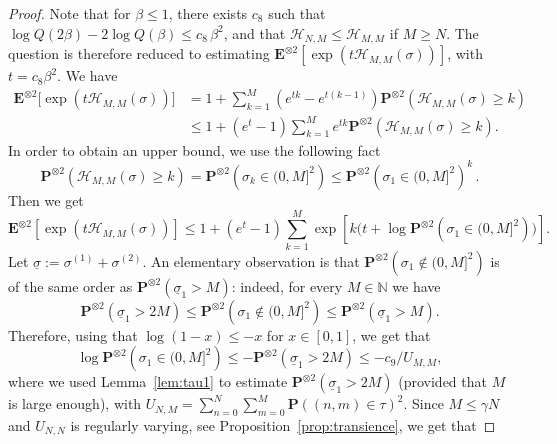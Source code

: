 \documentclass[AHL,Unicode,longabstracts]{cedram}
\newcommand{\cH}{\ensuremath{\mathcal{H}}}
\newcommand{\bP}{\ensuremath{\mathbf{P}}}
\newcommand{\bE}{\ensuremath{\mathbf{E}}}
\newcommand{\bbN}{\ensuremath{\mathbb{N}}}
\begin{document}
\begin{proof}
Note that for $\beta \le 1$, there exists $c_8$ such that $\log Q(2 \beta) - 2 \log Q(\beta) \le c_{8}\,\beta^ 2$, and that $\cH_{N,M} \leq \cH_{M,M}$ if $M\geq N$. The question is therefore reduced to estimating $\bE^{\otimes 2} \left[\exp (t \cH_{M,M}(\sigma)) \right]$, with $t=c_8 \beta^2$. We have
\begin{equation}
\begin{split}
\bE^{\otimes 2} \Big[\exp (t \cH_{M,M}(\sigma)) \Big] & = 1 + \sum_{k=1}^M \left(e^{tk} - e^{t (k-1)} \right) \bP^{\otimes 2} \left(\cH_{M,M}(\sigma) \ge k \right) \\
& \le 1+ (e^{t}-1) \sum_{k=1}^M e^{t k} \bP^{\otimes 2} \left(\cH_{M,M}(\sigma) \ge k \right).
\end{split}
\end{equation}
In order to obtain an upper bound, we use the following fact
\begin{equation}
\bP^{\otimes 2} \left(\cH_{M,M}(\sigma) \ge k \right) = \bP^{\otimes 2} \left(\sigma_k \in (0,M]^2\right) \le { \bP^{\otimes 2} \left(\sigma_1 \in (0,M]^2 \right) }^k\,.
\end{equation}
Then we get
\begin{equation}
\bE^{\otimes 2} \left[\exp (t \cH_{M,M}(\sigma)) \right] \le 1 + (e^{t}-1) \sum_{k=1}^M \exp \left[k \Big(t + \log \bP^{\otimes 2} \left(\sigma_1 \in (0,M]^2 \right) \Big)\right].
\end{equation}
Let $\underline{\sigma}:= \sigma^{(1)} + \sigma^{(2)}$. An elementary observation is that $\bP^{\otimes 2} \left(\sigma_1 \notin (0,M]^2 \right) $ is of the same order as $\bP^{\otimes 2} \left(\underline{\sigma}_1 >M \right) $: indeed, for every $M \in \bbN$ we have
\begin{equation}
\bP^{\otimes 2} \left(\underline{\sigma}_1 > 2 M \right) \le \bP^{\otimes 2} \left(\sigma_1 \notin (0,M]^2 \right) \le \bP^{\otimes 2} \left(\underline{\sigma}_1 > M \right).
\end{equation}
Therefore, using that $\log(1- x) \leq -x$ for $x\in [0,1]$, we get that
\begin{equation}
\log \bP^{\otimes 2} \left(\sigma_1 \in (0,M]^2 \right) \le - \bP^{\otimes 2} \left(\underline{\sigma}_1 > 2M \right) \leq - c_{9} /U_{M,M},
\end{equation}
where we used Lemma~\ref{lem:tau1} to estimate $\bP^{\otimes 2} \left(\underline{\sigma}_1 > 2M \right)$ (provided that $M$ is large enough), with $U_{N,M} =\sum_{n=0}^N \sum_{m=0}^M \bP((n,m)\in\tau)^2$. Since $M\leq \gamma N$ and $U_{N,N}$ is regularly varying, see Proposition~\ref{prop:transience}, we get that

\end{proof}
\end{document}
